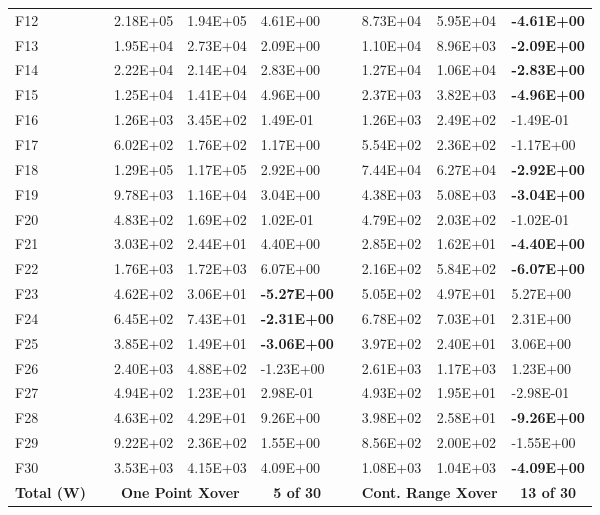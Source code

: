\documentclass[graybox]{svmult}
\begin{document}
\begin{table}[]
\begin{tabular}{@{}lllllllll@{}}
    F12 &  & 2.18E+05 & 1.94E+05 & 4.61E+00 &  & 8.73E+04 & 5.95E+04 & \textbf{-4.61E+00} \\
    F13 &  & 1.95E+04 & 2.73E+04 & 2.09E+00 &  & 1.10E+04 & 8.96E+03 & \textbf{-2.09E+00} \\
    F14 &  & 2.22E+04 & 2.14E+04 & 2.83E+00 &  & 1.27E+04 & 1.06E+04 & \textbf{-2.83E+00} \\
    F15 &  & 1.25E+04 & 1.41E+04 & 4.96E+00 &  & 2.37E+03 & 3.82E+03 & \textbf{-4.96E+00} \\
    F16 &  & 1.26E+03 & 3.45E+02 & 1.49E-01 &  & 1.26E+03 & 2.49E+02 & -1.49E-01 \\
    F17 &  & 6.02E+02 & 1.76E+02 & 1.17E+00 &  & 5.54E+02 & 2.36E+02 & -1.17E+00 \\
    F18 &  & 1.29E+05 & 1.17E+05 & 2.92E+00 &  & 7.44E+04 & 6.27E+04 & \textbf{-2.92E+00} \\
    F19 &  & 9.78E+03 & 1.16E+04 & 3.04E+00 &  & 4.38E+03 & 5.08E+03 & \textbf{-3.04E+00} \\
    F20 &  & 4.83E+02 & 1.69E+02 & 1.02E-01 &  & 4.79E+02 & 2.03E+02 & -1.02E-01 \\
    F21 &  & 3.03E+02 & 2.44E+01 & 4.40E+00 &  & 2.85E+02 & 1.62E+01 & \textbf{-4.40E+00} \\
    F22 &  & 1.76E+03 & 1.72E+03 & 6.07E+00 &  & 2.16E+02 & 5.84E+02 & \textbf{-6.07E+00} \\
    F23 &  & 4.62E+02 & 3.06E+01 & \textbf{-5.27E+00} &  & 5.05E+02 & 4.97E+01 & 5.27E+00 \\
    F24 &  & 6.45E+02 & 7.43E+01 & \textbf{-2.31E+00} &  & 6.78E+02 & 7.03E+01 & 2.31E+00 \\
    F25 &  & 3.85E+02 & 1.49E+01 & \textbf{-3.06E+00} &  & 3.97E+02 & 2.40E+01 & 3.06E+00 \\
    F26 &  & 2.40E+03 & 4.88E+02 & -1.23E+00 &  & 2.61E+03 & 1.17E+03 & 1.23E+00 \\
    F27 &  & 4.94E+02 & 1.23E+01 & 2.98E-01 &  & 4.93E+02 & 1.95E+01 & -2.98E-01 \\
    F28 &  & 4.63E+02 & 4.29E+01 & 9.26E+00 &  & 3.98E+02 & 2.58E+01 & \textbf{-9.26E+00} \\
    F29 &  & 9.22E+02 & 2.36E+02 & 1.55E+00 &  & 8.56E+02 & 2.00E+02 & -1.55E+00 \\
    F30 &  & 3.53E+03 & 4.15E+03 & 4.09E+00 &  & 1.08E+03 & 1.04E+03 & \textbf{-4.09E+00} \\
    \multicolumn{1}{c}{\textbf{Total (W)}} & \multicolumn{1}{c}{\textbf{}} & \multicolumn{2}{c}{\textbf{One Point Xover}} & \multicolumn{1}{c}{\textbf{5 of 30}} & \multicolumn{1}{c}{\textbf{}} & \multicolumn{2}{c}{\textbf{Cont. Range Xover}} & \multicolumn{1}{c}{\textbf{13 of 30}} \\ \bottomrule
    \end{tabular}
    \end{table}
\end{document}
